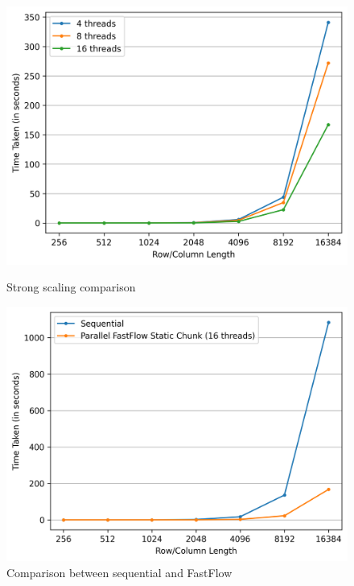 \begin{figure}[h!]
    \centering
    \begin{minipage}[t]{0.49\textwidth}
        \centering
        \includegraphics[width=\textwidth]{img/FastFlow/ff_static_graph.png}
        \caption{Strong scaling comparison}
        \label{FF_Strong_scaling}
    \end{minipage}
    \hfill
    \begin{minipage}[t]{0.49\textwidth}
        \centering
        \includegraphics[width=\textwidth]{img/FastFlow/ff_sequential_vs_fastflow.png}
        \caption{Comparison between sequential and FastFlow}
        \label{FF_Sequential_vs_FastFlow}
    \end{minipage}
    

\end{figure}
